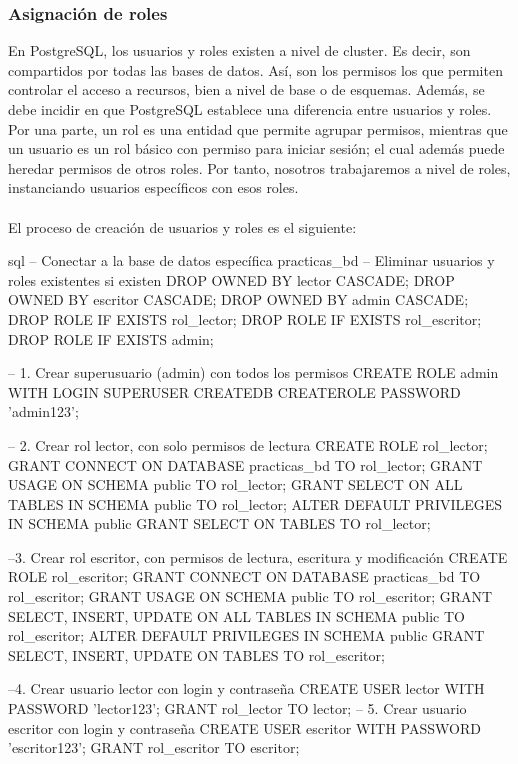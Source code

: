 \documentclass{article}
\begin{document}
\subsubsection{Asignación de roles}

En PostgreSQL, los usuarios y roles existen a nivel de cluster. Es decir, son compartidos por todas las bases de datos. Así, son los permisos los que permiten controlar el acceso a recursos, bien a nivel de base o de esquemas.
Además, se debe incidir en que PostgreSQL establece una diferencia entre usuarios y roles. Por una parte, un rol es una entidad que permite agrupar permisos, mientras que un usuario es un rol básico con permiso para iniciar sesión; el cual además puede heredar permisos de otros roles. Por tanto, nosotros trabajaremos a nivel de roles, instanciando usuarios específicos con esos roles.
 \\  \\
El proceso de creación de usuarios y roles es el siguiente:

\begin{codebox}{sql}
-- Conectar a la base de datos específica
\connect practicas\_bd
    -- Eliminar usuarios y roles existentes si existen
    DROP OWNED BY lector CASCADE;
    DROP OWNED BY escritor CASCADE;
    DROP OWNED BY admin CASCADE;
    DROP ROLE IF EXISTS rol\_lector;
    DROP ROLE IF EXISTS rol\_escritor;
    DROP ROLE IF EXISTS admin;

    -- 1. Crear superusuario (admin) con todos los permisos
    CREATE ROLE admin WITH LOGIN SUPERUSER CREATEDB CREATEROLE PASSWORD 'admin123';

    -- 2. Crear rol lector, con  solo permisos de lectura
    CREATE ROLE rol\_lector;
    GRANT CONNECT ON DATABASE practicas\_bd TO rol\_lector;
    GRANT USAGE ON SCHEMA public TO rol\_lector;
    GRANT SELECT ON ALL TABLES IN SCHEMA public TO rol\_lector;
    ALTER DEFAULT PRIVILEGES IN SCHEMA public GRANT SELECT ON TABLES TO rol\_lector;
    
    --3.  Crear rol escritor, con permisos de lectura, escritura y modificación
    CREATE ROLE rol\_escritor;
    GRANT CONNECT ON DATABASE practicas\_bd TO rol\_escritor;
    GRANT USAGE ON SCHEMA public TO rol\_escritor;
    GRANT SELECT, INSERT, UPDATE ON ALL TABLES IN SCHEMA public TO rol\_escritor;
    ALTER DEFAULT PRIVILEGES IN SCHEMA public GRANT SELECT, INSERT, UPDATE ON TABLES TO rol\_escritor;

    --4. Crear usuario lector con login y contraseña
    CREATE USER lector WITH PASSWORD 'lector123';
    GRANT rol\_lector TO lector;
    -- 5. Crear usuario escritor con login y contraseña
    CREATE USER escritor WITH PASSWORD 'escritor123';
    GRANT rol\_escritor TO escritor;
\end{codebox}
\end{document}
